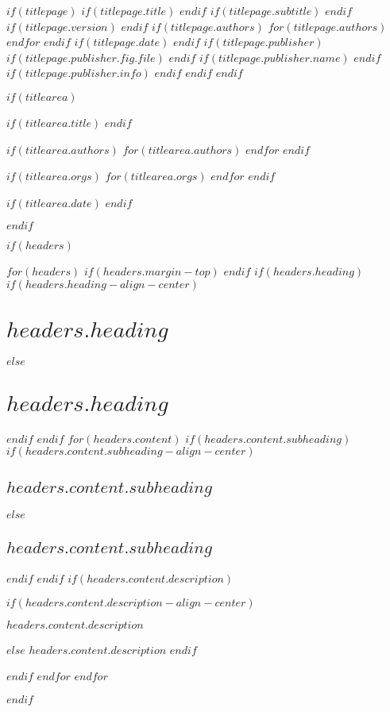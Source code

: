\documentclass[$if(fontsize)$$fontsize$$else$10pt$endif$, $if(papersize)$$papersize$$else$a4paper$endif$, oneside]{article}
\begin{document}
$if(titlepage)$
$if(titlepage.title)$
$endif$
$if(titlepage.subtitle)$
$endif$
$if(titlepage.version)$
$endif$
$if(titlepage.authors)$
$for(titlepage.authors)$
$endfor$
$endif$
$if(titlepage.date)$
$endif$
$if(titlepage.publisher)$
$if(titlepage.publisher.fig.file)$
$endif$
$if(titlepage.publisher.name)$
$endif$
$if(titlepage.publisher.info)$
$endif$
$endif$
\setcounter{page}{2}
$endif$

$if(titlearea)$

$if(titlearea.title)$
$endif$

$if(titlearea.authors)$
$for(titlearea.authors)$
$endfor$
$endif$

$if(titlearea.orgs)$
$for(titlearea.orgs)$
$endfor$
$endif$

$if(titlearea.date)$
$endif$


$endif$

$if(headers)$
{
\pagestyle{empty}
$for(headers)$
$if(headers.margin-top)$
\vspace*{$headers.margin-top$}
$endif$
$if(headers.heading)$
$if(headers.heading-align-center)$
\section*{\centering $headers.heading$}
$else$
\section*{$headers.heading$}
$endif$
$endif$
$for(headers.content)$
$if(headers.content.subheading)$
$if(headers.content.subheading-align-center)$
\subsection*{\centering $headers.content.subheading$}
$else$
\subsection*{$headers.content.subheading$}
$endif$
$endif$
$if(headers.content.description)$

$if(headers.content.description-align-center)$
{\centering $headers.content.description$ \par}
$else$
$headers.content.description$
$endif$


$endif$
$endfor$
\clearpage
$endfor$
}
$endif$
\end{document}
